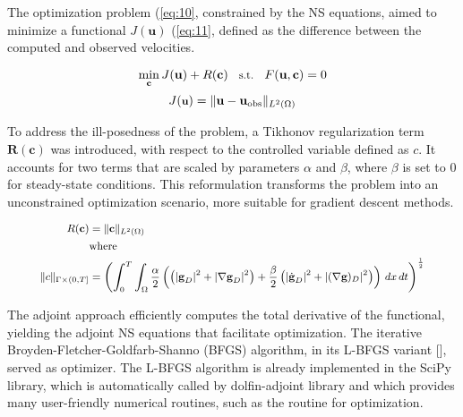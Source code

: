 The optimization problem (\cref{eq:10}, constrained by the NS equations, aimed to minimize a functional $J(\mathbf{u})$ (\cref{eq:11}, defined as the difference between the computed and observed velocities. 

\begin{equation}
\small
\min_{\mathbf{c}} J(\mathbf{u}) + R(\mathbf{c}) \quad \text{s.t.} \quad F(\mathbf{u}, \mathbf{c}) = 0
\label{eq:10}
\end{equation}
\begin{equation}
\small
    J(\textbf{u}) = \| \mathbf{u} - \mathbf{u}_{\text{obs}} \|_{L^2(\Omega)}
    \label{eq:11}
\end{equation}

To address the ill-posedness of the problem, a Tikhonov regularization term $\textbf{R}(\textbf{c})$ was introduced, with respect to the controlled variable defined as $c$. It accounts for two terms that are scaled by parameters \(\alpha\) and \(\beta\), where \(\beta\) is set to $0$ for steady-state conditions. This reformulation transforms the problem into an unconstrained optimization scenario, more suitable for gradient descent methods. 

\begin{equation}
\small
    \begin{aligned}
        R(\mathbf{c}) &= \| \mathbf{c} \|_{L^2(\Omega)} \\
        &\text{where} \\
        \small
        \|c\|_{\Gamma \times (0, T]} &= \left( \int_0^T \int_{\Omega} \frac{\alpha}{2} \left( \left(|\textbf{g}_D|^2 + |\nabla \textbf{g}_D|^2 \right) + \frac{\beta}{2} \left( |\dot{\textbf{g}}_D|^2 +  |(\nabla \textbf{g})_D|^2 \right) \right) \, dx \, dt \right)^{\frac{1}{2}}
    \end{aligned}
    \label{eq:12} 
\end{equation}

The adjoint approach efficiently computes the total derivative of the functional, yielding the adjoint NS equations that facilitate optimization. The iterative Broyden-Fletcher-Goldfarb-Shanno (BFGS) algorithm, in its L-BFGS variant [\cite{Liu1989}], served as optimizer. The L-BFGS algorithm is already implemented in the SciPy library, which is automatically
called by dolfin-adjoint library and which provides many user-friendly numerical routines, such as the routine for optimization.


